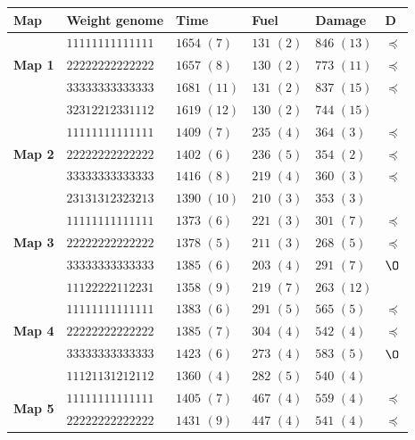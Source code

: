 \documentclass[journal]{IEEEtran}
\begin{document}
\begin{table}[!t]
\begin{center}
\begin{tabular}{|p{0.8cm}|p{1.95cm}|m{1.2cm}|m{1.05cm}|m{1.05cm}|m{0.1cm}|}
\hline
\textbf{Map}  & \textbf{Weight genome} & \textbf{Time} &  \textbf{Fuel} & \textbf{Damage} & \textbf{D}\\ 
\hline
 \multirow{3}{*}{\textbf{Map 1}} & $11111111111111$ & $1654$ $(7)$ & $131$ $(2)$& $846$ $(13)$ & $\preceq$ \\
 & $22222222222222$ & $1657$ $(8)$ & $130$ $(2)$ & $773$ $(11)$ & $\preceq$ \\
 & $33333333333333$ & $1681$ $(11)$ & $131$ $(2)$ & $837$ $(15)$ & $\preceq$ \\
 & $32312212331112$ & $1619$ $(12)$ & $130$ $(2)$ & $744$ $(15)$ & \\
\hline
 \multirow{3}{*}{\textbf{Map 2}} & $11111111111111$ & $1409$ $(7)$ & $235$ $(4)$& $364$ $(3)$ & $\preceq$ \\
 & $22222222222222$ & $1402$ $(6)$ & $236$ $(5)$ & $354$ $(2)$ & $\preceq$ \\
 & $33333333333333$ & $1416$ $(8)$ & $219$ $(4)$ & $360$ $(3)$ & $\preceq$ \\
 & $23131312323213$ & $1390$ $(10)$ & $210$ $(3)$ & $353$ $(3)$ & \\
\hline
 \multirow{3}{*}{\textbf{Map 3}} & $11111111111111$ & $1373$ $(6)$ & $221$ $(3)$& $301$ $(7)$ & $\preceq$ \\
 & $22222222222222$ & $1378$ $(5)$ & $211$ $(3)$ & $268$ $(5)$ & $\preceq$ \\
 & $33333333333333$ & $1385$ $(6)$ & $203$ $(4)$ & $291$ $(7)$ & $\O$ \\
 & $11122222112231$ & $1358$ $(9)$ & $219$ $(7)$ & $263$ $(12)$ & \\
\hline
 \multirow{3}{*}{\textbf{Map 4}} & $11111111111111$ & $1383$ $(6)$ & $291$ $(5)$& $565$ $(5)$ & $\preceq$ \\
 & $22222222222222$ & $1385$ $(7)$ & $304$ $(4)$ & $542$ $(4)$ & $\preceq$ \\
 & $33333333333333$ & $1423$ $(6)$ & $273$ $(4)$ & $583$ $(5)$ &  $\O$ \\
 & $11121131212112$ & $1360$ $(4)$ & $282$ $(5)$ & $540$ $(4)$ & \\
\hline
 \multirow{3}{*}{\textbf{Map 5}} & $11111111111111$ & $1405$ $(7)$ & $467$ $(4)$& $559$ $(4)$ & $\preceq$ \\
 & $22222222222222$ & $1431$ $(9)$ & $447$ $(4)$ &  $541$ $(4)$ & $\preceq$ \\

\end{tabular}
\end{center}
\end{table}
\end{document}
